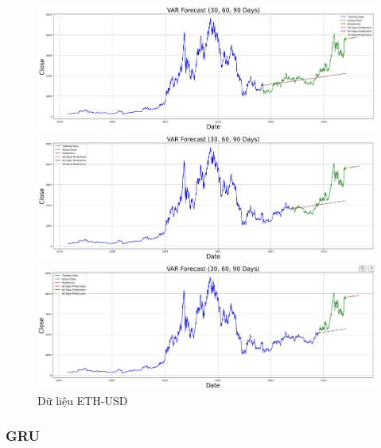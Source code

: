 \documentclass[conference]{IEEEtran}
\begin{document}
\begin{figure}[H]
    \centering
    \begin{minipage}{0.15\textwidth}
    \centering
    \includegraphics[width=1\textwidth]{Figure/VAR_ETH_7.jpg}
    \end{minipage}
    \hfill
    \begin{minipage}{0.15\textwidth}
    \centering
    \includegraphics[width=1\textwidth]{Figure/VAR_ETH_8.jpg}
    \end{minipage}
    \hfill
    \begin{minipage}{0.15\textwidth}
    \centering
    \includegraphics[width=1\textwidth]{Figure/VAR_ETH_9.jpg}
    \end{minipage}
    \caption{Dữ liệu ETH-USD}
    \label{fig:1}
\end{figure}

\subsubsection{GRU}
\end{document}
